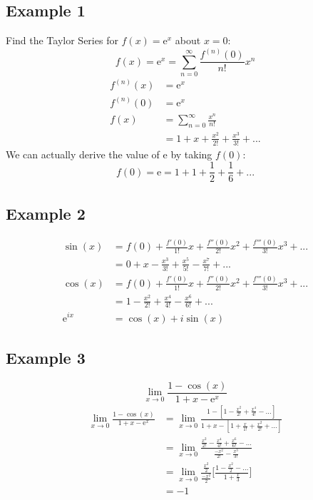 \documentclass[letterpaper, 12pt]{article}
\newcommand*{\e}{\mathrm{e}}
\begin{document}
\subsection*{Example 1}
Find the Taylor Series for \( f(x)= \e^{x} \) about \( x = 0 \):
\[ f(x) = \e^{x} = \sum_{n=0}^{\infty}\frac{f^{(n)}(0)}{n!}x^{n} \]
\begin{align*}
  f^{(n)}(x) &= \e^{x} \\
  f^{(n)}(0) &= \e^{x} \\
  f(x) &= \sum_{n=0}^{\infty}\frac{x^{n}}{n!} \\
  &= 1+x+\frac{x^{2}}{2!}+\frac{x^{3}}{3!}+...
\end{align*}
We can actually derive the value of \( \e \) by taking \( f(0) \):
\[ f(0) = \e = 1+1+\frac{1}{2}+\frac{1}{6}+... \]

\subsection*{Example 2}
\begin{align*}
  \sin(x) &= f(0)+\frac{f'(0)}{1!}x+\frac{f''(0)}{2!}x^{2}+
    \frac{f'''(0)}{3!}x^{3}+... \\
  &= 0+x-\frac{x^{3}}{3!}+\frac{x^{5}}{5!}-\frac{x^{7}}{7!}+... \\
  \cos(x) &= f(0)+\frac{f'(0)}{1!}x+\frac{f''(0)}{2!}x^{2}+
    \frac{f'''(0)}{3!}x^{3}+... \\
  &= 1-\frac{x^{2}}{2!}+\frac{x^{4}}{4!}-\frac{x^{6}}{6!}+... \\
  \e^{ix} &= \cos(x)+i\sin(x)
\end{align*}

\subsection*{Example 3}
\[ \lim_{x\to0}\frac{1-\cos(x)}{1+x-\e^{x}} \]
\begin{align*}
  \lim_{x\to0}\frac{1-\cos(x)}{1+x-\e^{x}} &=
    \lim_{x\to0}\frac{1-[1-\frac{x^{2}}{2!}+\frac{x^{4}}{4!}-...]}
      {1+x-[1+\frac{x}{1!}+\frac{x^{2}}{2!}+...]} \\
  &= \lim_{x\to0}\frac{\frac{x^{2}}{2!}-\frac{x^{4}}{4!}+\frac{x^{6}}{6!}-...}
    {\frac{-x^{2}}{2!}-\frac{x^{3}}{3!}} \\
  &= \lim_{x\to0}\frac{\frac{x^{2}}{2}}{\frac{-x^{2}}{2}}
    \bigg[\frac{1-\frac{x^{2}}{2}-...}{1+\frac{x}{3}}\bigg] \\
  &= -1
\end{align*}
\end{document}
